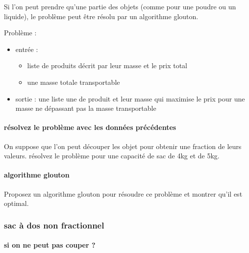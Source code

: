 \documentclass[
]{article}
\providecommand{\tightlist}{%
  \setlength{\itemsep}{0pt}\setlength{\parskip}{0pt}}
\begin{document}
Si l'on peut prendre qu'une partie des objets (comme pour une poudre ou
un liquide), le problème peut être résolu par un algorithme glouton.

Problème :

\begin{itemize}
\tightlist
\item
  entrée :

  \begin{itemize}
  \tightlist
  \item
    liste de produits décrit par leur masse et le prix total
  \item
    une masse totale transportable
  \end{itemize}
\item
  sortie : une liste une de produit et leur masse qui maximise le prix
  pour une masse ne dépassant pas la masse transportable
\end{itemize}

\hypertarget{ruxe9solvez-le-probluxe8me-avec-les-donnuxe9es-pruxe9cuxe9dentes}{%
\paragraph{résolvez le problème avec les données
précédentes}\label{ruxe9solvez-le-probluxe8me-avec-les-donnuxe9es-pruxe9cuxe9dentes}}

On suppose que l'on peut découper les objet pour obtenir une fraction de
leurs valeurs. résolvez le problème pour une capacité de sac de 4kg et
de 5kg.

\hypertarget{algorithme-glouton}{%
\paragraph{algorithme glouton}\label{algorithme-glouton}}

Proposez un algorithme glouton pour résoudre ce problème et montrer
qu'il est optimal.

\hypertarget{sac-uxe0-dos-non-fractionnel}{%
\subsubsection{sac à dos non
fractionnel}\label{sac-uxe0-dos-non-fractionnel}}

\hypertarget{si-on-ne-peut-pas-couper}{%
\paragraph{si on ne peut pas couper ?}\label{si-on-ne-peut-pas-couper}}
\end{document}
